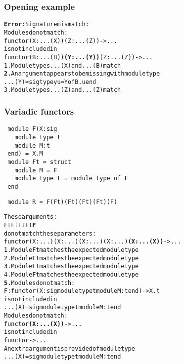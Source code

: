\documentclass[a4paper,11pt]{beamer}
\begin{document}
\begin{frame}[fragile]\frametitle{Opening example}
\begin{alltt}
{\bfseries{}\color{red}{}Error}: Signature mismatch:
       Modules do not match:
         functor {\color{green}{}(X : ...(X))} {\color{red}{}\bfseries{}} {\color{green}{}(Z : ...(Z))} -> ...
       is not included in
         functor {\color{green}{}(B : ...(B))} {\color{red}{}\bfseries{}(Y : ...(Y))} {\color{green}{}(Z : ...(Z))} -> ...
  {\color{green}{}1.} Module types ...(X) and ...(B) match
  {\color{red}{}\bfseries{}2.} An argument appears to be missing with module type
         ...(Y) = sig type yu = Y of B.u end
  {\color{green}{}3.} Module types ...(Z) and ...(Z) match
\end{alltt}
\end{frame}


\begin{frame}[fragile]\frametitle{Variadic functors}
 \begin{verbatim}
 module F(X:sig
   module type t
   module M:t
 end) = X.M
 module Ft = struct
   module M = F
   module type t = module type of F
 end
\end{verbatim}
\end{frame}

\begin{frame}[fragile]
\begin{verbatim}
 module R = F(Ft)(Ft)(Ft)(Ft)(F)
\end{verbatim}
\begin{alltt}
     These arguments:
       {\color{green}{}Ft} {\color{green}{}Ft} {\color{green}{}Ft} {\color{green}{}Ft} {\color{magenta}{}\bfseries{}F}
     do not match these parameters:
       functor {\color{green}{}(X : ...)} {\color{green}{}(X : ...)} {\color{green}{}(X : ...)} {\color{green}{}(X : ...)} {\color{magenta}{}\bfseries{}(X : ...(X))} -> ...
{\color{green}{}1.} Module Ft matches the expected module type
{\color{green}{}2.} Module Ft matches the expected module type
{\color{green}{}3.} Module Ft matches the expected module type
{\color{green}{}4.} Module Ft matches the expected module type
{\color{magenta}{}\bfseries{}5.} Modules do not match:
     F : functor (X : sig module type t module M : t end) -> X.t
   is not included in
     ...(X) = sig module type t module M : t end
   Modules do not match:
     functor {\color{red}{}\bfseries{}(X : ...(X))} -> ...
   is not included in
     functor {\color{red}{}\bfseries{}} -> ...
      An extra argument is provided of module type
          ...(X) = sig module type t module M : t end

\end{alltt}
\end{frame}
\end{document}
